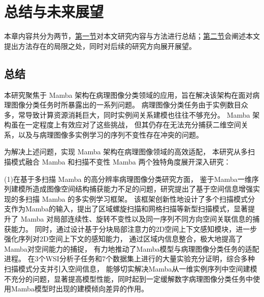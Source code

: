 \chapter[\hspace{0pt}总结与未来展望]{{\heiti{}\hspace{0pt}总结与未来展望}}\label{section 7}
\removelofgap
\removelotgap

本章内容共分为两节，\hyperref[section5: 总结]{第一节}对本文研究内容与方法进行总结；\hyperref[section5: 未来展望]{第二节}会阐述本文提出方法存在的局限之处，同时对后续的研究方向展开展望。


\section[\hspace{-2pt}总结]{{\heiti{} \hspace{-8pt}总结}}\label{section5: 总结}


本研究聚焦于 Mamba 架构在病理图像分类领域的应用，旨在解决该架构在面对病理图像分类任务时所暴露出的一系列问题。
病理图像分类任务由于实例数目众多，常导致计算资源消耗巨大，同时实例间关系建模也往往不够充分。
Mamba 架构虽在一定程度上有效应对了这些挑战，
但其仍存在无法充分捕获二维空间关系，以及与病理图像多实例学习的序列不变性存在冲突的问题。​

为解决上述问题，实现 Mamba 架构在病理图像领域的高效适配，
本研究从多扫描模式融合 Mamba 和扫描不变性 Mamba 两个独特角度展开深入研究：

(1)在基于多扫描 Mamba 的高分辨率病理图像分类研究方面，
鉴于Mamba一维序列建模所造成图像空间结构捕获能力不足的问题，研究提出了基于空间信息增强实现的多扫描 Mamba 的多实例学习框架。
该框架创新性地设计了多个扫描模式分支作为Mamba的输入，提出了区域螺旋扫描和网格扫描等新型扫描模式，显著提升了 Mamba 对局部连续性、旋转不变性以及同一序列不同方向空间关联信息的捕获能力。
同时，通过设计基于分块局部注意力的2D空间上下文感知模块，进一步强化序列对2D空间上下文的感知能力，
通过区域内信息整合，极大地提高了Mamba对空间能力的捕捉，
有力地推动了Mamba模型与病理图像分类任务的适配进程。
在3个WSI分析子任务和7个数据集上进行的大量实验充分证明，综合多种扫描模式分支并引入空间信息，
能够切实解决Mamba从一维实例序列中空间建模不充分的问题，显著提高模型性能，同时起到一定缓解数字病理图像分类任务中使用Mamba模型时出现的建模倾向差异的作用。​

